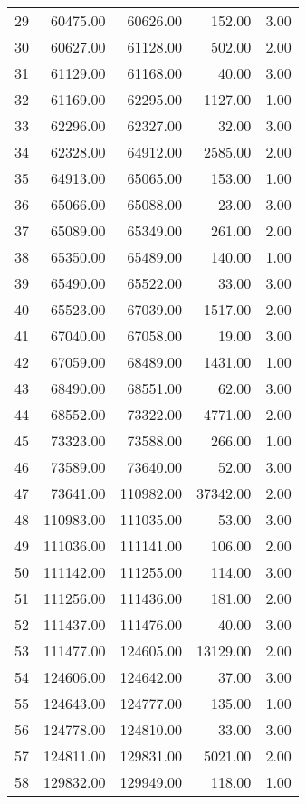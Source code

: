 \begin{tabular}{rrrrr}
  29 & 60475.00 & 60626.00 & 152.00 & 3.00 \\ 
  30 & 60627.00 & 61128.00 & 502.00 & 2.00 \\ 
  31 & 61129.00 & 61168.00 & 40.00 & 3.00 \\ 
  32 & 61169.00 & 62295.00 & 1127.00 & 1.00 \\ 
  33 & 62296.00 & 62327.00 & 32.00 & 3.00 \\ 
  34 & 62328.00 & 64912.00 & 2585.00 & 2.00 \\ 
  35 & 64913.00 & 65065.00 & 153.00 & 1.00 \\ 
  36 & 65066.00 & 65088.00 & 23.00 & 3.00 \\ 
  37 & 65089.00 & 65349.00 & 261.00 & 2.00 \\ 
  38 & 65350.00 & 65489.00 & 140.00 & 1.00 \\ 
  39 & 65490.00 & 65522.00 & 33.00 & 3.00 \\ 
  40 & 65523.00 & 67039.00 & 1517.00 & 2.00 \\ 
  41 & 67040.00 & 67058.00 & 19.00 & 3.00 \\ 
  42 & 67059.00 & 68489.00 & 1431.00 & 1.00 \\ 
  43 & 68490.00 & 68551.00 & 62.00 & 3.00 \\ 
  44 & 68552.00 & 73322.00 & 4771.00 & 2.00 \\ 
  45 & 73323.00 & 73588.00 & 266.00 & 1.00 \\ 
  46 & 73589.00 & 73640.00 & 52.00 & 3.00 \\ 
  47 & 73641.00 & 110982.00 & 37342.00 & 2.00 \\ 
  48 & 110983.00 & 111035.00 & 53.00 & 3.00 \\ 
  49 & 111036.00 & 111141.00 & 106.00 & 2.00 \\ 
  50 & 111142.00 & 111255.00 & 114.00 & 3.00 \\ 
  51 & 111256.00 & 111436.00 & 181.00 & 2.00 \\ 
  52 & 111437.00 & 111476.00 & 40.00 & 3.00 \\ 
  53 & 111477.00 & 124605.00 & 13129.00 & 2.00 \\ 
  54 & 124606.00 & 124642.00 & 37.00 & 3.00 \\ 
  55 & 124643.00 & 124777.00 & 135.00 & 1.00 \\ 
  56 & 124778.00 & 124810.00 & 33.00 & 3.00 \\ 
  57 & 124811.00 & 129831.00 & 5021.00 & 2.00 \\ 
  58 & 129832.00 & 129949.00 & 118.00 & 1.00 \\ 

\end{tabular}
